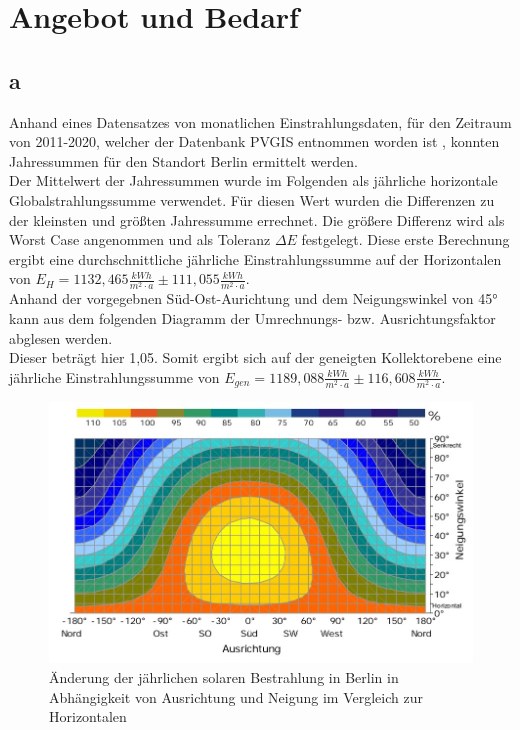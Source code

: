 \section{Angebot und Bedarf}
\label{sec:Angebot und Bedarf}
\subsection{a}
Anhand eines Datensatzes von monatlichen Einstrahlungsdaten, für den Zeitraum von 2011-2020, welcher der Datenbank PVGIS entnommen worden ist \cite{PVGIS}, konnten Jahressummen für den Standort Berlin ermittelt werden.\\
Der Mittelwert der Jahressummen wurde im Folgenden als jährliche horizontale Globalstrahlungssumme verwendet.
Für diesen Wert wurden die Differenzen zu der kleinsten und größten Jahressumme errechnet.
Die größere Differenz wird als Worst Case angenommen und als Toleranz $\Delta E$ festgelegt.
Diese erste Berechnung ergibt eine durchschnittliche jährliche Einstrahlungssumme
auf der Horizontalen von $E_H = 1132,465 \frac{kWh}{m^2\cdot a} \pm 111,055 \frac{kWh}{m^2\cdot a}$.\\
Anhand der vorgegebnen Süd-Ost-Aurichtung und dem Neigungswinkel von 45° kann aus dem folgenden Diagramm der Umrechnungs- bzw. Ausrichtungsfaktor abglesen werden.\\
Dieser beträgt hier 1,05. Somit ergibt sich auf der geneigten Kollektorebene eine jährliche Einstrahlungssumme von
$E_{gen} = 1189,088 \frac{kWh}{m^2\cdot a} \pm 116,608 \frac{kWh}{m^2\cdot a}$.

\begin{figure}[H]
  \centering
  \includegraphics[width=\textwidth]{Abbildungen/Ausrichtung.jpg}
  \caption{Änderung der jährlichen solaren Bestrahlung in Berlin in Abhängigkeit von Ausrichtung
  und Neigung im Vergleich zur Horizontalen \cite[S.92]{QUA19}}
  \label{fig:Ausrichtungsfaktor}
\end{figure}